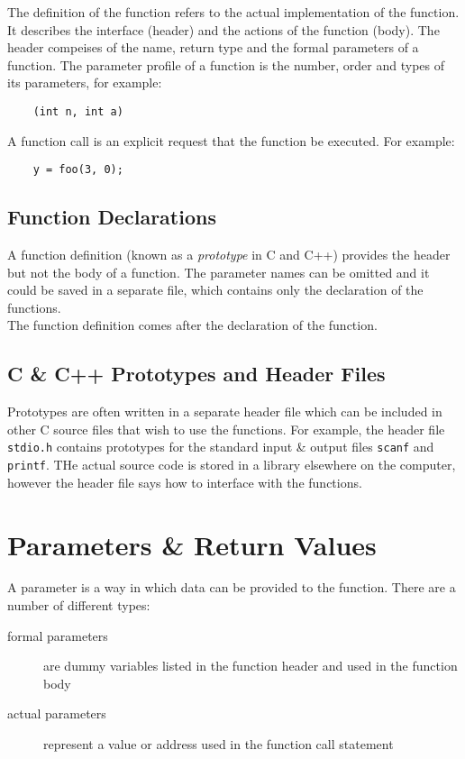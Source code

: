 The definition of the function refers to the actual implementation of the function. It describes the interface (header) and the actions of the function (body). The header compeises of the name, return type and the formal parameters of a function. The parameter profile of a function is the number, order and types of its parameters, for example:
\begin{verbatim}
    (int n, int a)
\end{verbatim}

A function call is an explicit request that the function be executed. For example:
\begin{verbatim}
    y = foo(3, 0);
\end{verbatim}

\subsection{Function Declarations}
A function definition (known as a \textit{prototype} in C and C++) provides the header but not the body of a function. The parameter names can be omitted and it could be saved in a separate file, which contains only the declaration of the functions.\\

The function definition comes after the declaration of the function. 

\subsection{C \& C++ Prototypes and Header Files}
Prototypes are often written in a separate header file which can be included in other C source files that wish to use the functions. For example, the header file \verb|stdio.h| contains prototypes for the standard input \& output files \verb|scanf| and \verb|printf|. THe actual source code is stored in a library elsewhere on the computer, however the header file says how to interface with the functions.

\section*{Parameters \& Return Values}
A parameter is a way in which data can be provided to the function. There are a number of different types:
\begin{description}
    \item[formal parameters] are dummy variables listed in the function header and used in the function body
    \item[actual parameters] represent a value or address used in the function call statement 
\end{description}

